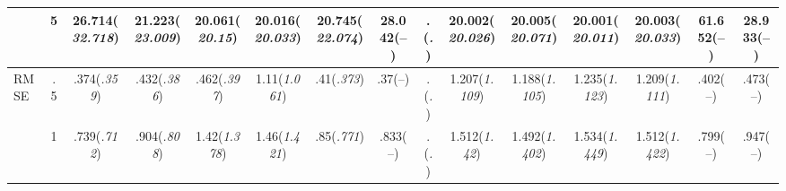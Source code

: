 \documentclass{article}
\begin{document}
\begin{table}[tbp]
{\begin{tabularx}{\textwidth}{lCCCCCCCCCCCCCC}
&5&26.714\newline (\emph{32.718})&21.223\newline (\emph{23.009})&20.061\newline (\emph{20.15})&20.016\newline (\emph{20.033})&20.745\newline (\emph{22.074})&28.042\newline (--)&.\newline (\emph{.})&20.002\newline (\emph{20.026})&20.005\newline (\emph{20.071})&20.001\newline (\emph{20.011})&20.003\newline (\emph{20.033})&61.652\newline (--)&28.933\newline (--) \tabularnewline
\midrule RMSE&.5&.374\newline (\emph{.359})&.432\newline (\emph{.386})&.462\newline (\emph{.397})&1.11\newline (\emph{1.061})&.41\newline (\emph{.373})&.37\newline (--)&.\newline (\emph{.})&1.207\newline (\emph{1.109})&1.188\newline (\emph{1.105})&1.235\newline (\emph{1.123})&1.209\newline (\emph{1.111})&.402\newline (--)&.473\newline (--) \tabularnewline
&1&.739\newline (\emph{.712})&.904\newline (\emph{.808})&1.42\newline (\emph{1.378})&1.46\newline (\emph{1.421})&.85\newline (\emph{.771})&.833\newline (--)&.\newline (\emph{.})&1.512\newline (\emph{1.42})&1.492\newline (\emph{1.402})&1.534\newline (\emph{1.449})&1.512\newline (\emph{1.422})&.799\newline (--)&.947\newline (--) \tabularnewline

\end{tabularx}}
\end{table}
\end{document}
